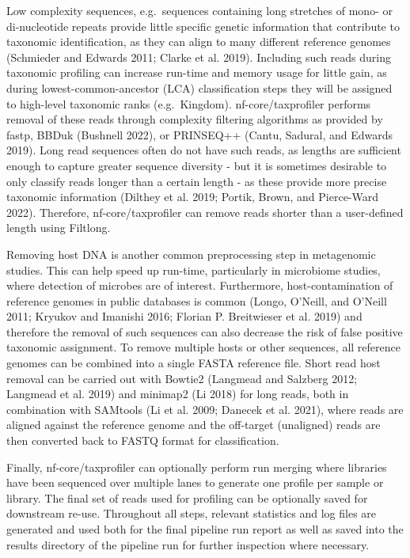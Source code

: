 \documentclass[
]{article}
\begin{document}
Low complexity sequences, e.g.~sequences containing long stretches of
mono- or di-nucleotide repeats provide little specific genetic
information that contribute to taxonomic identification, as they can
align to many different reference genomes (Schmieder and Edwards 2011;
Clarke et al. 2019). Including such reads during taxonomic profiling can
increase run-time and memory usage for little gain, as during
lowest-common-ancestor (LCA) classification steps they will be assigned
to high-level taxonomic ranks (e.g.~Kingdom). nf-core/taxprofiler
performs removal of these reads through complexity filtering algorithms
as provided by fastp, BBDuk (Bushnell 2022), or PRINSEQ++ (Cantu,
Sadural, and Edwards 2019). Long read sequences often do not have such
reads, as lengths are sufficient enough to capture greater sequence
diversity - but it is sometimes desirable to only classify reads longer
than a certain length - as these provide more precise taxonomic
information (Dilthey et al. 2019; Portik, Brown, and Pierce-Ward 2022).
Therefore, nf-core/taxprofiler can remove reads shorter than a
user-defined length using Filtlong.

Removing host DNA is another common preprocessing step in metagenomic
studies. This can help speed up run-time, particularly in microbiome
studies, where detection of microbes are of interest. Furthermore,
host-contamination of reference genomes in public databases is common
(Longo, O'Neill, and O'Neill 2011; Kryukov and Imanishi 2016; Florian P.
Breitwieser et al. 2019) and therefore the removal of such sequences can
also decrease the risk of false positive taxonomic assignment. To remove
multiple hosts or other sequences, all reference genomes can be combined
into a single FASTA reference file. Short read host removal can be
carried out with Bowtie2 (Langmead and Salzberg 2012; Langmead et al.
2019) and minimap2 (Li 2018) for long reads, both in combination with
SAMtools (Li et al. 2009; Danecek et al. 2021), where reads are aligned
against the reference genome and the off-target (unaligned) reads are
then converted back to FASTQ format for classification.

Finally, nf-core/taxprofiler can optionally perform run merging where
libraries have been sequenced over multiple lanes to generate one
profile per sample or library. The final set of reads used for profiling
can be optionally saved for downstream re-use. Throughout all steps,
relevant statistics and log files are generated and used both for the
final pipeline run report as well as saved into the results directory of
the pipeline run for further inspection where necessary.
\end{document}
